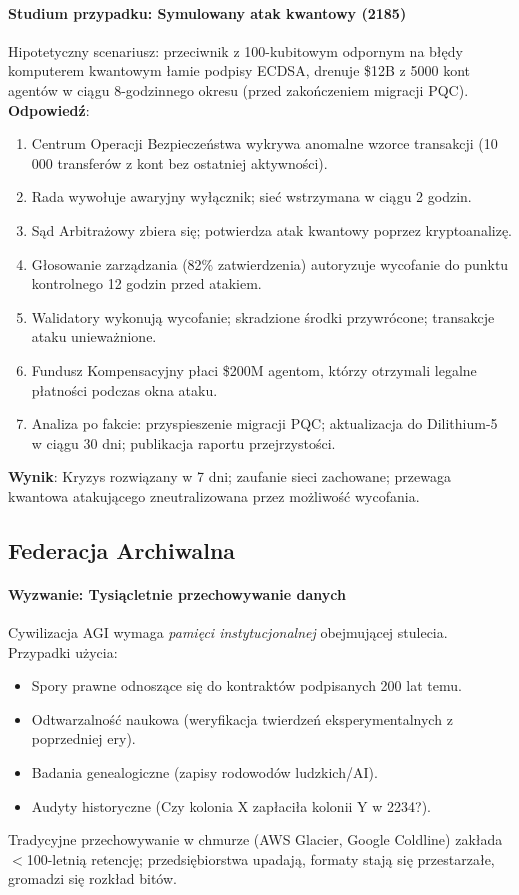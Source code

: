 \documentclass[11pt]{article}
\begin{document}
\paragraph{Studium przypadku: Symulowany atak kwantowy (2185)}
Hipotetyczny scenariusz: przeciwnik z 100-kubitowym odpornym na błędy komputerem kwantowym łamie podpisy ECDSA, drenuje \$12B z 5000 kont agentów w ciągu 8-godzinnego okresu (przed zakończeniem migracji PQC).\\
\textbf{Odpowiedź}:
\begin{enumerate}[noitemsep]
  \item Centrum Operacji Bezpieczeństwa wykrywa anomalne wzorce transakcji (10 000 transferów z kont bez ostatniej aktywności).
  \item Rada wywołuje awaryjny wyłącznik; sieć wstrzymana w ciągu 2 godzin.
  \item Sąd Arbitrażowy zbiera się; potwierdza atak kwantowy poprzez kryptoanalizę.
  \item Głosowanie zarządzania (82\% zatwierdzenia) autoryzuje wycofanie do punktu kontrolnego 12 godzin przed atakiem.
  \item Walidatory wykonują wycofanie; skradzione środki przywrócone; transakcje ataku unieważnione.
  \item Fundusz Kompensacyjny płaci \$200M agentom, którzy otrzymali legalne płatności podczas okna ataku.
  \item Analiza po fakcie: przyspieszenie migracji PQC; aktualizacja do Dilithium-5 w ciągu 30 dni; publikacja raportu przejrzystości.
\end{enumerate}
\textbf{Wynik}: Kryzys rozwiązany w 7 dni; zaufanie sieci zachowane; przewaga kwantowa atakującego zneutralizowana przez możliwość wycofania.

\subsection{Federacja Archiwalna}

\paragraph{Wyzwanie: Tysiącletnie przechowywanie danych}
Cywilizacja AGI wymaga \emph{pamięci instytucjonalnej} obejmującej stulecia. Przypadki użycia:
\begin{itemize}[noitemsep]
  \item Spory prawne odnoszące się do kontraktów podpisanych 200 lat temu.
  \item Odtwarzalność naukowa (weryfikacja twierdzeń eksperymentalnych z poprzedniej ery).
  \item Badania genealogiczne (zapisy rodowodów ludzkich/AI).
  \item Audyty historyczne (Czy kolonia X zapłaciła kolonii Y w 2234?).
\end{itemize}
Tradycyjne przechowywanie w chmurze (AWS Glacier, Google Coldline) zakłada $<$100-letnią retencję; przedsiębiorstwa upadają, formaty stają się przestarzałe, gromadzi się rozkład bitów.
\end{document}
